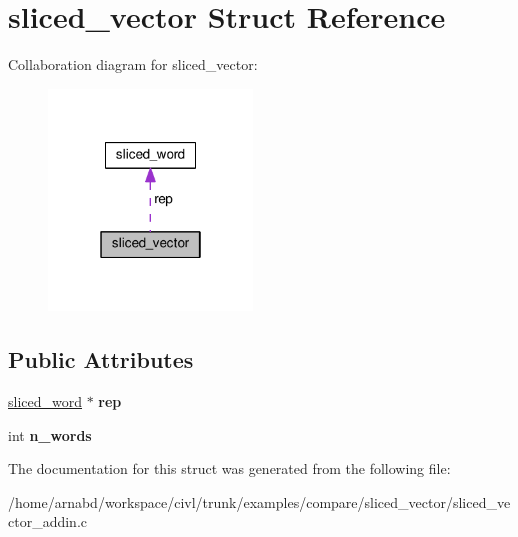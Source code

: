\hypertarget{structsliced__vector}{}\section{sliced\+\_\+vector Struct Reference}
\label{structsliced__vector}


Collaboration diagram for sliced\+\_\+vector\+:
\nopagebreak
\begin{figure}[H]
\begin{center}
\leavevmode
\includegraphics[width=154pt]{structsliced__vector__coll__graph}
\end{center}
\end{figure}
\subsection*{Public Attributes}
\begin{DoxyCompactItemize}
\item 
\hypertarget{structsliced__vector_a493c0fe45902be2cd04b293448089629}{}\hyperlink{structsliced__word}{sliced\+\_\+word} $\ast$ {\bfseries rep}\label{structsliced__vector_a493c0fe45902be2cd04b293448089629}

\item 
\hypertarget{structsliced__vector_af6316ff61b12dc44060349ab09f0ec5a}{}int {\bfseries n\+\_\+words}\label{structsliced__vector_af6316ff61b12dc44060349ab09f0ec5a}

\end{DoxyCompactItemize}


The documentation for this struct was generated from the following file\+:\begin{DoxyCompactItemize}
\item 
/home/arnabd/workspace/civl/trunk/examples/compare/sliced\+\_\+vector/sliced\+\_\+vector\+\_\+addin.\+c\end{DoxyCompactItemize}
